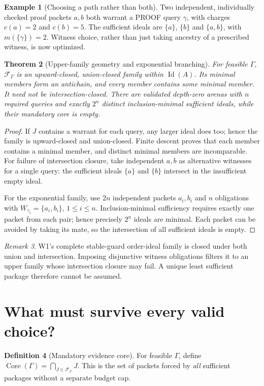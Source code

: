 \documentclass[10pt,letterpaper]{article}
\newtheorem{theorem}{Theorem}[section]
\theoremstyle{definition}
\newtheorem{definition}[theorem]{Definition}
\newtheorem{example}[theorem]{Example}
\theoremstyle{remark}
\newtheorem{remark}[theorem]{Remark}
\newcommand{\Core}{\operatorname{Core}}
\newcommand{\Id}{\operatorname{Id}}
\begin{document}
\begin{example}[Choosing a path rather than both]
Two independent, individually checked proof packets $a,b$ both warrant a PROOF query $\gamma$, with charges $c(a)=2$ and $c(b)=5$. The sufficient ideals are $\{a\}$, $\{b\}$ and $\{a,b\}$, with $m(\{\gamma\})=2$. Witness choice, rather than just taking ancestry of a prescribed witness, is now optimized.
\end{example}

\begin{theorem}[Upper-family geometry and exponential branching]\label{thm:antichain}
For feasible $\Gamma$, $\mathcal F_\Gamma$ is an upward-closed, union-closed family within $\Id(A)$. Its minimal members form an antichain, and every member contains some minimal member. It need not be intersection-closed. There are validated depth-zero arenas with $n$ required queries and exactly $2^n$ distinct inclusion-minimal sufficient ideals, while their mandatory core is empty.
\end{theorem}
\begin{proof}
If $J$ contains a warrant for each query, any larger ideal does too; hence the family is upward-closed and union-closed. Finite descent proves that each member contains a minimal member, and distinct minimal members are incomparable. For failure of intersection closure, take independent $a,b$ as alternative witnesses for a single query: the sufficient ideals $\{a\}$ and $\{b\}$ intersect in the insufficient empty ideal.

For the exponential family, use $2n$ independent packets $a_i,b_i$ and $n$ obligations with $W_{\gamma_i}=\{a_i,b_i\}$, $1\le i\le n$. Inclusion-minimal sufficiency requires exactly one packet from each pair; hence precisely $2^n$ ideals are minimal. Each packet can be avoided by taking its mate, so the intersection of all sufficient ideals is empty.
\end{proof}

\begin{remark}
W1's complete stable-guard order-ideal family is closed under both union and intersection. Imposing disjunctive witness obligations filters it to an upper family whose intersection closure may fail. A unique least sufficient package therefore cannot be assumed.
\end{remark}

\section{What must survive every valid choice?}\label{gl-first-W2-s4}
\begin{definition}[Mandatory evidence core]
For feasible $\Gamma$, define $\Core(\Gamma)=\bigcap_{J\in\mathcal F_\Gamma}J$. This is the set of packets forced by \emph{all} sufficient packages without a separate budget cap.
\end{definition}
\end{document}
